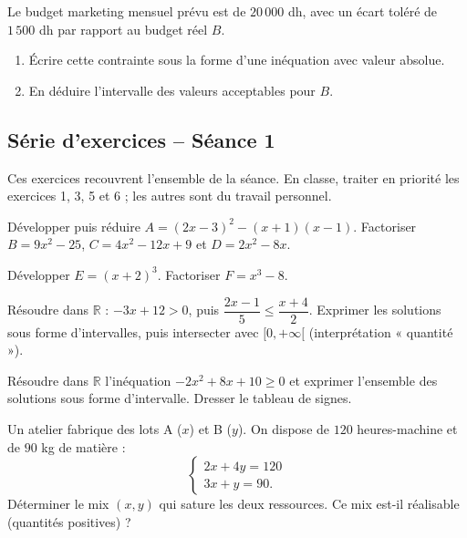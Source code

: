 \documentclass[12pt,a4paper]{article}
\begin{document}
\begin{exobox}
Le budget marketing mensuel prévu est de $20\,000$ dh, avec un écart toléré de $1\,500$ dh par rapport au budget réel $B$.
\begin{enumerate}[label=\alph*)]
  \item Écrire cette contrainte sous la forme d'une inéquation avec valeur absolue.
  \item En déduire l'intervalle des valeurs acceptables pour $B$.
\end{enumerate}
\end{exobox}

\subsection{Série d'exercices -- Séance 1}

Ces exercices recouvrent l'ensemble de la séance. En classe, traiter en priorité les exercices 1, 3, 5 et 6 ; les autres sont du travail personnel.

\begin{exobox}
Développer puis réduire $A = (2x-3)^2 - (x+1)(x-1)$. Factoriser $B = 9x^2-25$, $C = 4x^2-12x+9$ et $D=2x^2-8x$.
\end{exobox}

\begin{exobox}
Développer $E=(x+2)^3$. Factoriser $F=x^3-8$.
\end{exobox}

\begin{exobox}
Résoudre dans $\mathbb{R}$ : $-3x+12 > 0$, puis $ \dfrac{2x-1}{5} \leqslant \dfrac{x+4}{2}$. Exprimer les solutions sous forme d'intervalles, puis intersecter avec $[0,+\infty[$ (interprétation « quantité »).
\end{exobox}

\begin{exobox}
Résoudre dans $\mathbb{R}$ l'inéquation $-2x^2+8x+10 \geqslant 0$ et exprimer l'ensemble des solutions sous forme d'intervalle. Dresser le tableau de signes.
\end{exobox}

\begin{exobox}
Un atelier fabrique des lots A ($x$) et B ($y$). On dispose de $120$ heures-machine et de $90$ kg de matière :
$$\begin{cases} 2x + 4y = 120 \\ 3x + y = 90. \end{cases}$$
Déterminer le mix $(x,y)$ qui sature les deux ressources. Ce mix est-il réalisable (quantités positives) ?
\end{exobox}
\end{document}
